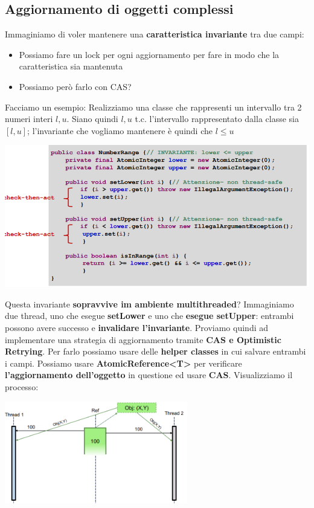 \documentclass[12pt]{article}
\begin{document}
\subsection{Aggiornamento di oggetti complessi}
Immaginiamo di voler mantenere una \textbf{caratteristica invariante} tra due campi:
\begin{itemize}
    \item Possiamo fare un lock per ogni aggiornamento per fare in modo che la caratteristica sia mantenuta
    \item Possiamo però farlo con CAS?
\end{itemize}
Facciamo un esempio: Realizziamo una classe che rappresenti un intervallo tra 2 numeri interi $l, u$. Siano quindi $l, u$ t.c. l'intervallo rappresentato dalla classe sia $[l,u]$; l'invariante che vogliamo mantenere è quindi che $l \leq u$
\begin{center}
    \includegraphics[width = 1\textwidth]{Images/94.PNG}
\end{center}
Questa invariante \textbf{sopravvive im ambiente multithreaded}? Immaginiamo due thread, uno che esegue \textbf{setLower} e uno che \textbf{esegue setUpper}: entrambi possono avere successo e \textbf{invalidare l'invariante}. Proviamo quindi ad implementare una strategia di aggiornamento tramite \textbf{CAS e Optimistic Retrying}. Per farlo possiamo usare delle \textbf{helper classes} in cui salvare entrambi i campi. Possiamo usare \newline \textbf{AtomicReference<T>} per verificare \textbf{l'aggiornamento dell'oggetto} in questione ed usare \textbf{CAS}. Visualizziamo il processo:
\begin{center}
    \includegraphics[width = 0.60\textwidth]{Images/95.PNG}
\end{center}
\end{document}
